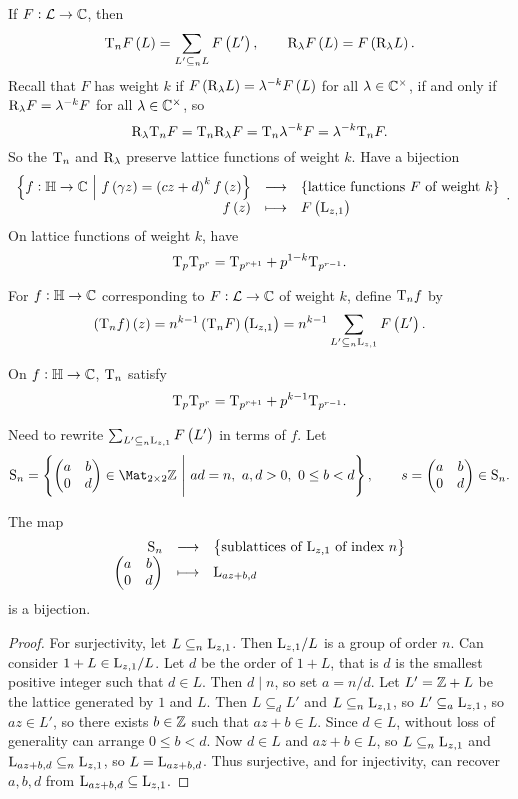 
If $ F : \mathcal{L} \to \mathbb{C} $, then
$$ \T_nF\br{L} = \sum_{L' \subseteq_n L} F\br{L'}, \qquad \R_\lambda F\br{L} = F\br{\R_\lambda L}. $$
Recall that $ F $ has weight $ k $ if $ F\br{\R_\lambda L} = \lambda^{-k}F\br{L} $ for all $ \lambda \in \mathbb{C}^\times $, if and only if $ \mathrm{R}_\lambda F = \lambda^{-k}F $ for all $ \lambda \in \mathbb{C}^\times $, so
$$ \mathrm{R}_\lambda\mathrm{T}_nF = \mathrm{T}_n\mathrm{R}_\lambda F = \mathrm{T}_n\lambda^{-k}F = \lambda^{-k}\mathrm{T}_nF. $$
So the $ \mathrm{T}_n $ and $ \mathrm{R}_\lambda $ preserve lattice functions of weight $ k $. Have a bijection
$$ \function{\cbr{f : \HH \to \CC \st f\br{\gamma z} = \br{cz + d}^kf\br{z}}}{\cbr{\text{lattice functions} \ F \ \text{of weight} \ k}}{f\br{z}}{F\br{\L_{z, 1}}}. $$
On lattice functions of weight $ k $, have
$$ \mathrm{T}_p\mathrm{T}_{p^r} = \mathrm{T}_{p^{r + 1}} + p^{1 - k}\mathrm{T}_{p^{r - 1}}. $$

\begin{definition}
For $ f : \mathbb{H} \to \mathbb{C} $ corresponding to $ F : \mathcal{L} \to \mathbb{C} $ of weight $ k $, define $ \mathrm{T}_nf $ by
$$ \br{\T_nf}\br{z} = n^{k - 1}\br{\T_nF}\br{\L_{z, 1}} = n^{k - 1}\sum_{L' \subseteq_n \L_{z, 1}} F\br{L'}. $$
\end{definition}

On $ f : \mathbb{H} \to \mathbb{C} $, $ \mathrm{T}_n $ satisfy
$$ \mathrm{T}_p\mathrm{T}_{p^r} = \mathrm{T}_{p^{r + 1}} + p^{k - 1}\mathrm{T}_{p^{r - 1}}. $$

\pagebreak

Need to rewrite $ \sum_{L' \subseteq_n \L_{z, 1}} F\br{L'} $ in terms of $ f $. Let
$$ \S_n = \cbr{\twobytwo{a}{b}{0}{d} \in \Mat_{2 \times 2} \ZZ \st ad = n, \ a, d > 0, \ 0 \le b < d}, \qquad s = \twobytwo{a}{b}{0}{d} \in \S_n. $$

\begin{lemma}
The map
$$ \function{\S_n}{\cbr{\text{sublattices of} \ \L_{z, 1} \ \text{of index} \ n}}{\twobytwo{a}{b}{0}{d}}{\L_{az + b, d}} $$
is a bijection.
\end{lemma}

\begin{proof}
For surjectivity, let $ L \subseteq_n \mathrm{L}_{z, 1} $. Then $ \mathrm{L}_{z, 1} / L $ is a group of order $ n $. Can consider $ 1 + L \in \mathrm{L}_{z, 1} / L $. Let $ d $ be the order of $ 1 + L $, that is $ d $ is the smallest positive integer such that $ d \in L $. Then $ d \mid n $, so set $ a = n / d $. Let $ L' = \mathbb{Z} + L $ be the lattice generated by $ 1 $ and $ L $. Then $ L \subseteq_d L' $ and $ L \subseteq_n \mathrm{L}_{z, 1} $, so $ L' \subseteq_a \mathrm{L}_{z, 1} $, so $ az \in L' $, so there exists $ b \in \mathbb{Z} $ such that $ az + b \in L $. Since $ d \in L $, without loss of generality can arrange $ 0 \le b < d $. Now $ d \in L $ and $ az + b \in L $, so $ L \subseteq_n \mathrm{L}_{z, 1} $ and $ \mathrm{L}_{az + b, d} \subseteq_n \mathrm{L}_{z, 1} $, so $ L = \mathrm{L}_{az + b, d} $. Thus surjective, and for injectivity, can recover $ a, b, d $ from $ \mathrm{L}_{az + b, d} \subseteq \mathrm{L}_{z, 1} $.
\end{proof}

